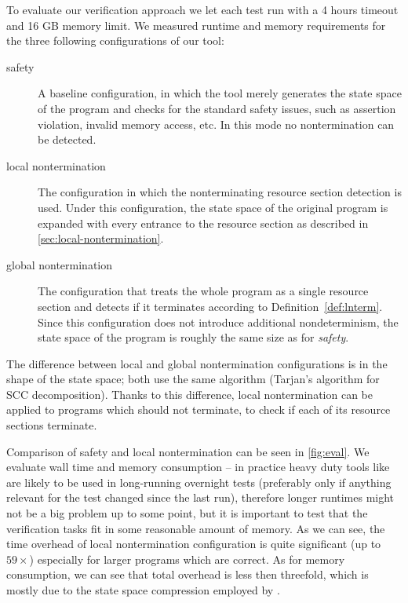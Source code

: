 To evaluate our verification approach we let each test run with a 4 hours
timeout and 16 GB memory limit. We measured runtime and memory requirements for
the three following configurations of our tool:
\begin{description}
\item[safety] A baseline configuration, in which the tool merely generates the
  state space of the program and checks for the standard safety issues, such as
  assertion violation, invalid memory access, etc. In this mode no
  nontermination can be detected.
    \item[local nontermination] The configuration in which the nonterminating
      resource section detection is used. Under this configuration, the state
      space of the original program is expanded with every entrance to the
      resource section as described in \autoref{sec:local-nontermination}.
    \item[global nontermination] The configuration that treats the whole program
      as a single resource section and detects if it terminates according to
      Definition~\ref{def:lnterm}. Since this configuration does not introduce
      additional nondeterminism, the state space of the program is roughly the
      same size as for \emph{safety}.
\end{description}
The difference between local and global nontermination configurations is
in the shape of the state space; both use the same algorithm (Tarjan's
algorithm for SCC decomposition). Thanks to this difference, local nontermination
can be applied to programs which should not terminate, to check if each of its
resource sections terminate.

Comparison of safety and local nontermination can be seen in \autoref{fig:eval}.  We
evaluate wall time and memory consumption -- in practice heavy duty tools like
\divine are likely to be used in long-running overnight tests (preferably only
if anything relevant for the test changed since the last run), therefore longer
runtimes might not be a big problem up to some point, but it is important to
test that the verification tasks fit in some reasonable amount of memory.  As we
can see, the time overhead of local nontermination configuration is quite
significant (up to $59 \times$) especially for larger programs which are
correct. As for memory consumption, we can see that total overhead is less then
threefold, which is mostly due to the state space compression employed by
\divine.

